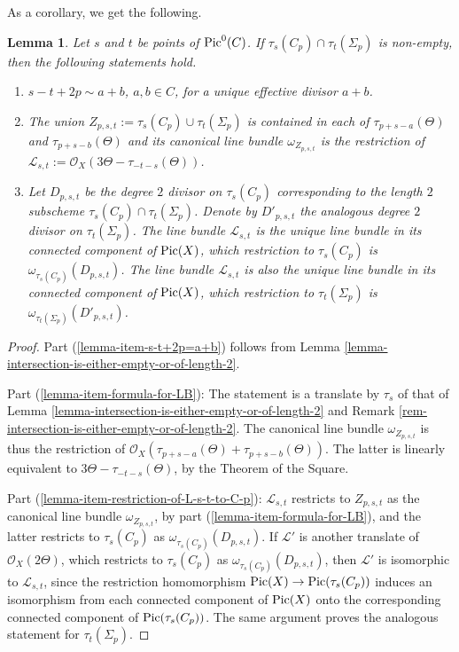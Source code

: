 \documentclass[12pt]{amsart}
\numberwithin{equation}{subsection}
\theoremstyle{plain}
\newtheorem{lem}[thm]{Lemma}
\theoremstyle{definition}
\newcommand{\LB}{{\mathcal L}}
\newcommand{\StructureSheaf}[1]{{\mathcal O}_{#1}}
\newcommand{\Pic}{{\rm Pic}}
\begin{document}
As a corollary, we get the following.

\begin{lem}
\label{lemma-LB-s-t}
Let $s$ and $t$ be points of $\Pic^0(C)$. If $\tau_s(C_p)\cap \tau_t(\Sigma_p)$ is non-empty, then 
the following statements hold.
\begin{enumerate}
\item
\label{lemma-item-s-t+2p=a+b}
$s-t+2p\sim a+b$, $a,b\in C$, for a unique effective divisor $a+b$. 
\item
\label{lemma-item-formula-for-LB}
The union $Z_{p,s,t}:=\tau_s(C_p)\cup\tau_t(\Sigma_p)$ is contained in each of 
$\tau_{p+s-a}(\Theta)$ and $\tau_{p+s-b}(\Theta)$ and its canonical line bundle  $\omega_{Z_{p,s,t}}$ is the restriction of 
$\LB_{s,t}:=\StructureSheaf{X}(3\Theta-\tau_{-t-s}(\Theta))$. 
\item
\label{lemma-item-restriction-of-L-s-t-to-C-p}
Let $D_{p,s,t}$ be the degree $2$ divisor on $\tau_s(C_p)$ corresponding to the length $2$ subscheme $\tau_s(C_p)\cap \tau_t(\Sigma_p)$. Denote by $D'_{p,s,t}$ the analogous degree $2$ divisor on $\tau_t(\Sigma_p)$. 
The line bundle $\LB_{s,t}$ is the unique line bundle in its connected component of $\Pic(X)$, which restriction to $\tau_s(C_p)$ is $\omega_{\tau_s(C_p)}(D_{p,s,t})$. The line bundle $\LB_{s,t}$ is also the unique line bundle in its connected component of $\Pic(X)$, which restriction to $\tau_t(\Sigma_p)$ is $\omega_{\tau_t(\Sigma_p)}(D'_{p,s,t})$. 
\end{enumerate}
\end{lem}

\begin{proof}
Part (\ref{lemma-item-s-t+2p=a+b}) follows from Lemma \ref{lemma-intersection-is-either-empty-or-of-length-2}.

Part (\ref{lemma-item-formula-for-LB}): The statement is a translate by $\tau_s$ of that of 
Lemma \ref{lemma-intersection-is-either-empty-or-of-length-2} 
and Remark \ref{rem-intersection-is-either-empty-or-of-length-2}. The canonical line bundle $\omega_{Z_{p,s,t}}$ is thus  the restriction of 
$
\StructureSheaf{X}(\tau_{p+s-a}(\Theta)+\tau_{p+s-b}(\Theta)).
$
The latter is linearly equivalent to $3\Theta-\tau_{-t-s}(\Theta)$, by the Theorem of the Square.


Part (\ref{lemma-item-restriction-of-L-s-t-to-C-p}): 
$\LB_{s,t}$ restricts to $Z_{p,s,t}$ as the canonical line bundle $\omega_{Z_{p,s,t}}$, by part (\ref{lemma-item-formula-for-LB}),
and the latter restricts to $\tau_s(C_p)$ as $\omega_{\tau_s(C_p)}(D_{p,s,t})$. If $\LB'$ is another translate of $\StructureSheaf{X}(2\Theta)$, which restricts to $\tau_s(C_p)$ as $\omega_{\tau_s(C_p)}(D_{p,s,t})$, then
$\LB'$ is isomorphic to $\LB_{s,t}$, since the restriction homomorphism $\Pic(X)\rightarrow \Pic(\tau_s(C_p))$ induces an isomorphism from each connected component of $\Pic(X)$ onto the corresponding connected component of $\Pic(\tau_s(C_p))$.
The same argument proves the analogous statement for $\tau_t(\Sigma_p)$.
\end{proof}
\end{document}
